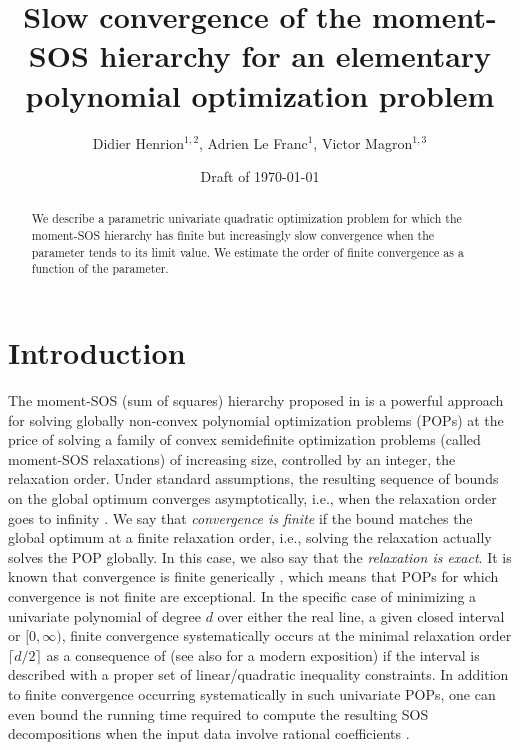 \documentclass[a4paper,12pt]{article}
\title{\bf Slow convergence of the moment-SOS hierarchy for an elementary polynomial optimization problem}
\begin{document}
\author{Didier Henrion$^{1,2}$, Adrien Le Franc$^{1}$, Victor Magron$^{1,3}$}



\date{Draft of \today}

\maketitle

\begin{abstract}
We describe a parametric univariate quadratic optimization problem for which the moment-SOS hierarchy has finite but increasingly slow convergence when the parameter tends to its limit value. We estimate the order of finite convergence as a function of the parameter. 
\end{abstract}

\section{Introduction}


The moment-SOS (sum of squares) hierarchy proposed in \cite{l01} is a powerful approach for solving globally non-convex polynomial optimization problems (POPs) at the price of solving a family of convex semidefinite optimization problems (called moment-SOS relaxations) of increasing size, controlled by an integer, the relaxation order. Under standard assumptions, the resulting sequence of bounds on the global optimum converges asymptotically, i.e., when the relaxation order goes to infinity \cite{hkl20,h23,n23}. We say that {\it convergence is finite} if the bound matches the global optimum at a finite relaxation order, i.e., solving the relaxation actually solves the POP globally. 
In this case, we also say that the {\it relaxation is exact}. 
It is known that convergence is finite generically \cite{nie2014optimality}, which means that POPs for which convergence is not finite
are exceptional. 
%
In the specific case of minimizing a univariate polynomial of degree $d$ over either the real line, a given closed interval or $[0, \infty)$, finite convergence systematically occurs at the minimal relaxation order $\lceil d/2 \rceil$ as a consequence of \cite{fekete35,ps76} (see also \cite[~\S~2.3]{l09} for a modern exposition) if the interval is described with a proper set of linear/quadratic inequality constraints. 
In addition to finite convergence occurring systematically in such univariate POPs, one can even bound the running time required to compute the resulting SOS decompositions when the input data involve rational coefficients \cite{mag19,mag22}. 
%
\end{document}
